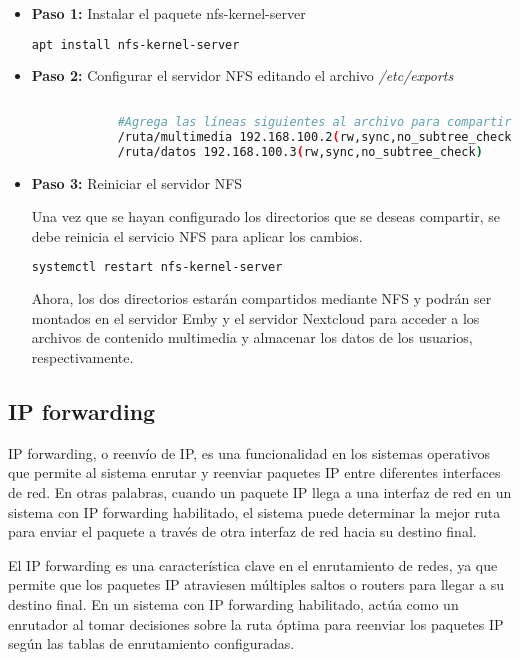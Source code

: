 		
		\begin{itemize}
			\item \textbf{Paso 1:} Instalar el paquete nfs-kernel-server
			\begin{lstlisting}[language=Bash, caption=nfs]
		apt install nfs-kernel-server
			\end{lstlisting}
		
			\item\textbf{Paso 2:} Configurar el servidor NFS editando el archivo \textit{/etc/exports}
			\begin{lstlisting}[language=Bash, caption=export]
		
			#Agrega las líneas siguientes al archivo para compartir los dos directorios:
			/ruta/multimedia 192.168.100.2(rw,sync,no_subtree_check)
			/ruta/datos 192.168.100.3(rw,sync,no_subtree_check)
			\end{lstlisting}
				
			\item\textbf{Paso 3:} Reiniciar el servidor NFS\par
			Una vez que se hayan configurado los directorios que se deseas compartir, se debe reinicia el servicio NFS para aplicar los cambios.
			\begin{lstlisting}[language=Bash, caption=export]
			systemctl restart nfs-kernel-server
			\end{lstlisting}
				
			Ahora, los dos directorios estarán compartidos mediante NFS y podrán ser montados en el servidor Emby y el servidor Nextcloud para acceder a los archivos de contenido multimedia y almacenar los datos de los usuarios, respectivamente. 
		\end{itemize}
		
		\subsection{IP forwarding}
		
		IP forwarding, o reenvío de IP, es una funcionalidad en los sistemas operativos que permite al sistema enrutar y reenviar paquetes IP entre diferentes interfaces de red. En otras palabras, cuando un paquete IP llega a una interfaz de red en un sistema con IP forwarding habilitado, el sistema puede determinar la mejor ruta para enviar el paquete a través de otra interfaz de red hacia su destino final.\par
		
		El IP forwarding es una característica clave en el enrutamiento de redes, ya que permite que los paquetes IP atraviesen múltiples saltos o routers para llegar a su destino final. En un sistema con IP forwarding habilitado, actúa como un enrutador al tomar decisiones sobre la ruta óptima para reenviar los paquetes IP según las tablas de enrutamiento configuradas.\par
		
